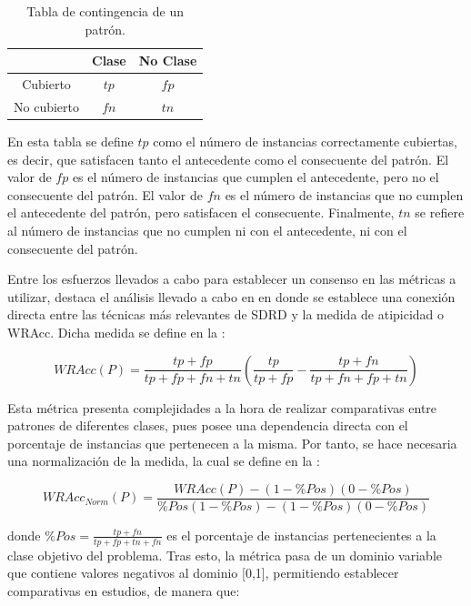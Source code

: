 \documentclass[c5paper,10pt,twoside]{book}	   	%
\begin{document}
\begin{table}[!hbtp]
	\centering
	\caption{Tabla de contingencia de un patrón.}
	\begin{tabular}{c|cc}
		& Clase & No Clase \\ \hline
		Cubierto & $tp$ & $fp$ \\
		No cubierto & $fn$ & $tn$ \\ \hline
	\end{tabular} 
	\label{tab:tablaContingencia}
\end{table}

En esta tabla se define $tp$ como el número de instancias correctamente cubiertas, es decir, que satisfacen tanto el antecedente como el consecuente del patrón. El valor de $fp$ es el número de instancias que cumplen el antecedente, pero no el consecuente del patrón. El valor de $fn$ es el número de instancias que no cumplen el antecedente del patrón, pero satisfacen el consecuente. Finalmente, $tn$ se refiere al número de instancias que no cumplen ni con el antecedente, ni con el consecuente del patrón.

Entre los esfuerzos llevados a cabo para establecer un consenso en las métricas a utilizar, destaca el análisis llevado a cabo en \cite{Cdh18} en donde se establece una conexión directa entre las técnicas más relevantes de \ac{SDRD} y la medida de atipicidad o \ac{WRAcc}. Dicha medida se define en la :

\begin{equation}\label{eq:WRAcc}
WRAcc(P) = \frac{tp+fp}{tp+fp+fn+tn} \left(\frac{tp}{tp+fp} - \frac{tp+fn}{tp+fn+fp+tn}\right)
\end{equation}

Esta métrica presenta complejidades a la hora de realizar comparativas entre patrones de diferentes clases, pues posee una dependencia directa con el porcentaje de instancias que pertenecen a la misma. Por tanto, se hace necesaria una normalización de la medida, la cual se define en la :



\begin{equation}\label{eq:WRAccNorm}
WRAcc_{Norm}(P) = \frac{WRAcc(P) - \left(1 - \%Pos \right) \left(0 - \%Pos\right)}{\%Pos \left(1 - \%Pos\right) - \left(1 - \%Pos\right)\left(0 - \%Pos\right)}
\end{equation}

\noindent donde $\%Pos = \frac{tp + fn}{tp+fp+tn+fn}$ es el porcentaje de instancias pertenecientes a la clase objetivo del problema. Tras esto, la métrica pasa de un dominio variable que contiene valores negativos al dominio [0,1], permitiendo establecer comparativas en estudios, de manera que:
\end{document}
